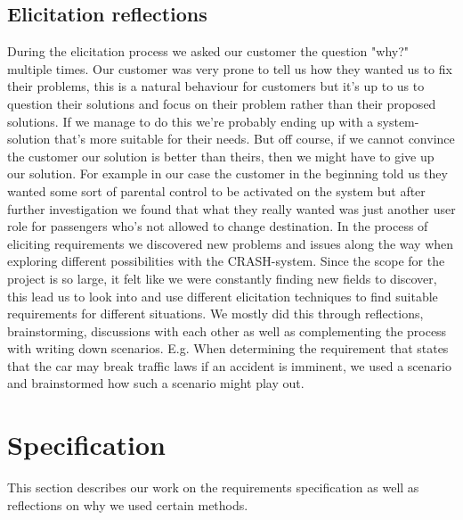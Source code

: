\documentclass[10pt]{article}
\begin{document}
\subsection{Elicitation reflections}
During the elicitation process we asked our customer the question "why?" multiple times. Our customer was very prone to tell us how they wanted us to fix their problems, this is a natural behaviour for customers but it's up to us to question their solutions and focus on their problem rather than their proposed solutions. If we manage to do this we're probably ending up with a system-solution that's more suitable for their needs. But off course, if we cannot convince the customer our solution is better than theirs, then we might have to give up our solution.
For example in our case the customer in the beginning told us they wanted some sort of parental control to be activated on the system but after further investigation we found that what they really wanted was just another user role for passengers who's not allowed to change destination.
\newline
\indent
{}
In the process of eliciting requirements we discovered new problems and issues along the way when exploring different possibilities with the CRASH-system. Since the scope for the project is so large, it felt like we were constantly finding new fields to discover, this lead us to look into and use different elicitation techniques to find suitable requirements for different situations. We mostly did this through reflections, brainstorming, discussions with each other as well as complementing the process with writing down scenarios. E.g. When determining the requirement that states that the car may break traffic laws if an accident is imminent, we used a scenario and brainstormed how such a scenario might play out. 

\section{Specification}
This section describes our work on the requirements specification as well as reflections on why we used certain methods. 
\end{document}
